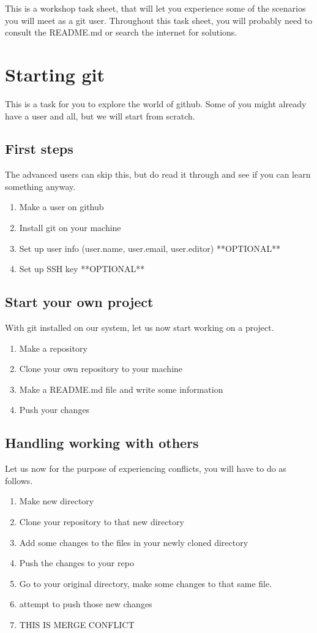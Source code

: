 \documentclass[12 pt,a4paper]{article}
\newcommand{\Fin}{
\vfill
\begin{center}
\textit{ }\label{FIN}
\end{center}}
\begin{document}
\noindent This is a workshop task sheet, 
that will let you experience some of the scenarios you will meet as a git user.
Throughout this task sheet,
you will probably need to consult the README.md or search the internet for solutions.

\section*{Starting git}
This is a task for you to explore the world of github.
Some of you might already have a user and all, 
but we will start from scratch.

\subsection*{First steps}
The advanced users can skip this,
but do read it through and see if you can learn something anyway.
\begin{enumerate}
  \item Make a user on github
  \item Install git on your machine
  \item Set up user info (user.name, user.email, user.editor) **OPTIONAL**
  \item Set up SSH key **OPTIONAL**
\end{enumerate}

\subsection*{Start your own project}
With git installed on our system, let us now start working on a project.
\begin{enumerate}
\item Make a repository
\item Clone your own repository to your machine
\item Make a README.md file and write some information
\item Push your changes
\end{enumerate}

\subsection*{Handling working with others}
Let us now for the purpose of experiencing conflicts, you will have to do as follows.

\begin{enumerate}
\item Make new directory
\item Clone your repository to that new directory
\item Add some changes to the files in your newly cloned directory
\item Push the changes to your repo
\item Go to your original directory, make some changes to that same file.
\item attempt to push those new changes
\item THIS IS MERGE CONFLICT 
\end{enumerate}

\Fin
\end{document}
